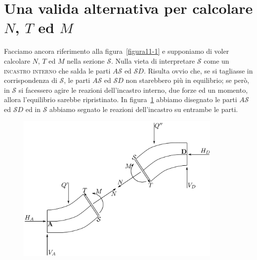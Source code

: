 \clearpage
\pagestyle{fancy}
\part{Una valida alternativa per calcolare $N$, $T$ ed $M$}
\setcounter{section}{0}
Facciamo ancora riferimento alla figura~\vref{figura11-1} e supponiamo di voler calcolare $N$, $T$ ed $M$ nella sezione $\mathcal{S}$. Nulla vieta di interpretare $\mathcal{S}$ come un \textsc{incastro interno} che salda le parti $A\mathcal{S}$ ed $\mathcal{S}D$. Risulta ovvio che, se si tagliasse in corrispondenza di $\mathcal{S}$, le parti $A\mathcal{S}$ ed $\mathcal{S}D$ non starebbero più in equilibrio; se però, in $\mathcal{S}$ si facessero agire le reazioni dell'incastro interno, due forze ed un momento, allora l'equilibrio sarebbe ripristinato. In figura~\ref{figura12-1} abbiamo disegnato le parti $A\mathcal{S}$ ed $\mathcal{S}D$ ed in $\mathcal{S}$ abbiamo segnato le reazioni dell'incastro su entrambe le parti. 
\renewcommand{\thefigure}{12~-~1}
\begin{figure}[ht]
\centering
\includegraphics[width=0.89\textwidth]{Immagini/Parte_12/Figura12_1/figura12_1.pdf}
\caption{}
\label{figura12-1}
\end{figure}
